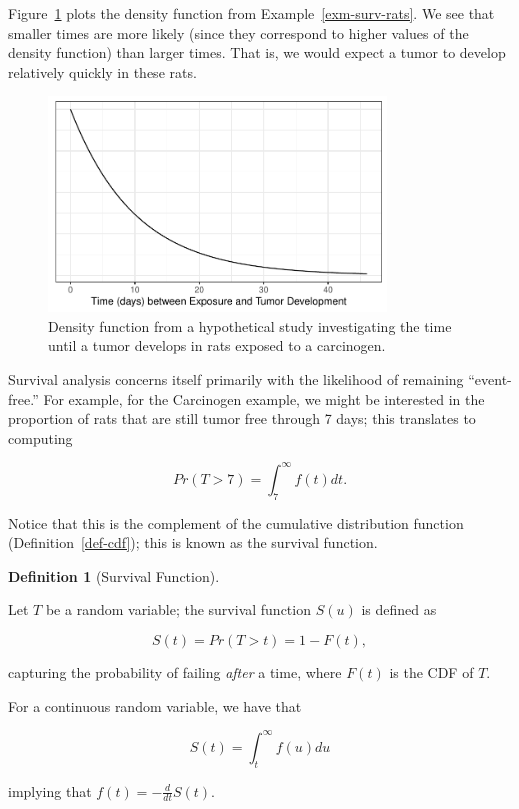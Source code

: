 \documentclass[
  letterpaper,
  DIV=11,
  numbers=noendperiod]{scrreprt}
\theoremstyle{definition}
\newtheorem{definition}{Definition}[chapter]
\theoremstyle{definition}
\theoremstyle{remark}
\begin{document}
Figure~\ref{fig-surv-density} plots the density function from
Example~\ref{exm-surv-rats}. We see that smaller times are more likely
(since they correspond to higher values of the density function) than
larger times. That is, we would expect a tumor to develop relatively
quickly in these rats.

\begin{figure}

{\centering \includegraphics[width=0.8\textwidth,height=\textheight]{./images/fig-surv-density-1.pdf}

}

\caption{\label{fig-surv-density}Density function from a hypothetical
study investigating the time until a tumor develops in rats exposed to a
carcinogen.}

\end{figure}

Survival analysis concerns itself primarily with the likelihood of
remaining ``event-free.'' For example, for the Carcinogen example, we
might be interested in the proportion of rats that are still tumor free
through 7 days; this translates to computing

\[Pr(T > 7) = \int_{7}^{\infty} f(t) dt.\]

Notice that this is the complement of the cumulative distribution
function (Definition~\ref{def-cdf}); this is known as the survival
function.

\begin{definition}[Survival
Function]\protect\hypertarget{def-survival}{}\label{def-survival}

Let \(T\) be a random variable; the survival function \(S(u)\) is
defined as

\[S(t) = Pr(T > t) = 1 - F(t),\]

capturing the probability of failing \emph{after} a time, where \(F(t)\)
is the CDF of \(T\).

For a continuous random variable, we have that

\[S(t) = \int_{t}^{\infty} f(u) du\]

implying that \(f(t) = -\frac{d}{dt} S(t)\).

\end{definition}
\end{document}
